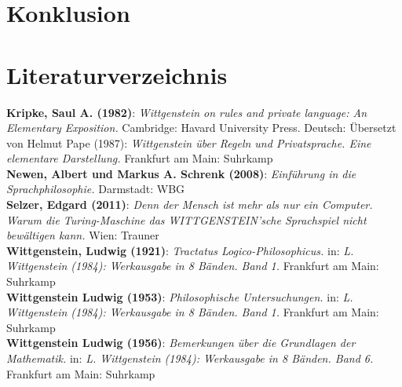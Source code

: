 \documentclass[a4paper,12pt]{article}
\begin{document}
\section{Konklusion}
\blindtext[1]

\section*{Literaturverzeichnis}
\textbf{Kripke, Saul A. (1982)}: \textit{Wittgenstein on rules and private language: An Elementary Exposition.} Cambridge: Havard University Press. Deutsch: Übersetzt von Helmut Pape (1987): \textit{Wittgenstein über Regeln und Privatsprache. Eine elementare Darstellung.} Frankfurt am Main: Suhrkamp \\
\textbf{Newen, Albert und Markus A. Schrenk (2008)}: \textit{Einführung in die Sprachphilosophie.} Darmstadt: WBG \\
\textbf{Selzer, Edgard (2011)}: \textit{Denn der Mensch ist mehr als nur ein Computer. Warum die Turing-Maschine das WITTGENSTEIN'sche Sprachspiel nicht bewältigen kann.} Wien: Trauner \\
\textbf{Wittgenstein, Ludwig (1921)}: \textit{Tractatus Logico-Philosophicus.} in: \textit{L. Wittgenstein (1984): Werkausgabe in 8 Bänden. Band 1.} Frankfurt am Main: Suhrkamp \\
\textbf{Wittgenstein Ludwig (1953)}: \textit{Philosophische Untersuchungen.} in: \textit{L. Wittgenstein (1984): Werkausgabe in 8 Bänden. Band 1.} Frankfurt am Main: Suhrkamp \\
\textbf{Wittgenstein Ludwig (1956)}: \textit{Bemerkungen über die Grundlagen der Mathematik.} in: \textit{L. Wittgenstein (1984): Werkausgabe in 8 Bänden. Band 6.} Frankfurt am Main: Suhrkamp \\
\end{document}
